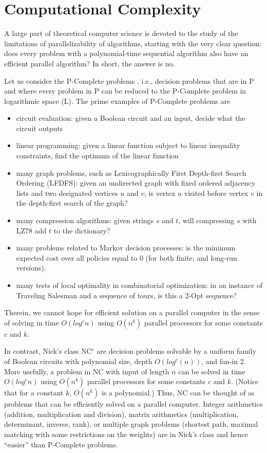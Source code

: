 \section{Computational Complexity}

A large part of theoretical computer science is devoted to the study of the limitations of parallelizability of algorithms, starting with the very clear question: does every problem 
with a polynomial-time sequential algorithm also have an efficient parallel algorithm? In short, the answer is no. 

Let us consider the P-Complete problems \cite{greenlaw1995limits}, i.e.,  decision problems that are in P and where every problem in P can be reduced to the P-Complete problem in logarithmic space (L). The prime examples of P-Complete problems are 
\begin{itemize} 
\item circuit evaluation: given a Boolean circuit and an input, decide what the circuit outputs
\item linear programming: given a linear function subject to linear inequality constraints, find the optimum of the linear function
\item many graph problems, such as Lexicographically First Depth-first Search Ordering (LFDFS):
given an undirected graph with fixed ordered adjacency lists and two designated vertices $u$ and $v$, is vertex $u$ visited before vertex $v$ in the depth-first search of the graph?
\item many compression algorithms: given strings $s$ and $t$, will compressing $s$ with LZ78 add $t$ to the dictionary?
\item many problems related to Markov decision processes: is the minimum expected cost over all policies equal to 0 (for both finite, and long-run versions). 
\item many tests of local optimality in combinatorial optimization: in an instance of Traveling Salesman and a sequence of tours, is this a 2-Opt sequence? 
\end{itemize} 
Therein, we cannot hope for efficient solution on a parallel computer in the sense of solving in time $O(log^c n)$ using $O(n^k)$ parallel processors for some constants $c$ and $k$. 

\label{sec:Nicks}
In contrast, Nick's class NC$^{c}$ are decision problems solvable by a uniform family of Boolean circuits with polynomial size, depth $O(log^c(n))$, and fan-in 2. More usefully, a problem in NC with input of length $n$ can be solved in time $O(log^c n)$ using $O(n^k)$ parallel processors for some constants $c$ and $k$. (Notice that for a constant $k$, $O(n^k)$ is a polynomial.) Thus, NC can be thought of as problems that can be efficiently solved on a parallel computer. Integer arithmetics (addition, multiplication and division), matrix arithmetics (multiplication, determinant, inverse, rank), or multiple graph problems (shortest path, maximal matching with some restrictions on the weights) are in Nick's class and hence ``easier'' than P-Complete problems. 

